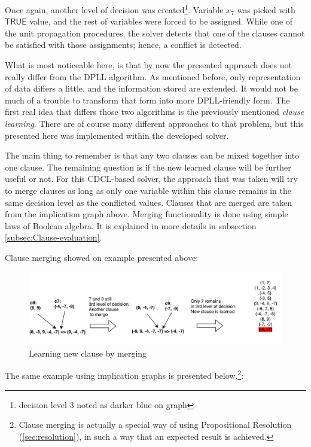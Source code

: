\documentclass[12pt,english,pdflatex]{aghdpl}
\begin{document}
Once again, another level of decision was created\footnote{decision level 3 noted as darker blue on graph}.
Variable $x_7$ was picked with $\mathsf{TRUE}$ value, and the rest of variables were
forced to be assigned. While one of the unit propagation procedures, the solver detects
that one of the clauses cannot be satisfied with those assignments; hence,
a conflict is detected.

What is most noticeable here, is that by now
the presented approach  does not really differ from the DPLL algorithm. As mentioned before,
only representation of data differs a little, and the information stored
are extended. It would not be much of a trouble to transform that form into
more DPLL-friendly form. The first real idea that differs those two algorithms
is the previously  mentioned \textit{clause learning}. There are of course many
different approaches to that problem, but this presented here was
implemented within the developed solver.

The main thing to remember is that any two clauses can be mixed together
into one clause. The remaining question is if the new learned clause will
be further useful or not. For this CDCL-based solver, the approach that
was taken will try to merge clauses as long as only one  variable within
this clause remains in the same decision level as the conflicted values.
Clauses that are merged are taken from the implication graph above. Merging
functionality is done using simple laws of Boolean algebra. It is explained
in more details in subsection \ref{subsec:Clause-evaluation}.

Clause merging showed on example presented above:
\begin{figure}[H]
\begin{centering}
\includegraphics[scale=0.6]{img/CDCL_learning}
\par\end{centering}
\caption{Learning new clause by merging}
\end{figure}
The same example using implication graphs is presented below.\footnote{Clause merging is actually a special way of using Propositional Resolution (\ref{sec:resolution}), in such a way that an expected result is achieved.}:
\end{document}
